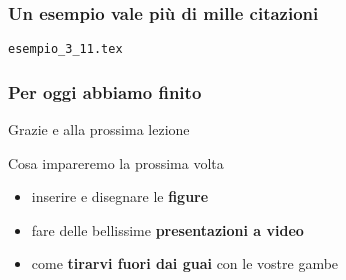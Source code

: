 \documentclass[svgnames,%
	ucs,%
	pdftex]{guitbeamer}
\begin{document}
\begin{frame}
\begin{columns}
		\begin{LaTeXoutput}
			\\
			\\
			\\	
			\\
			\\
			\\
			\\
			\\
			\\
			\\
		\end{LaTeXoutput}
	\end{columns}
\end{frame}
\begin{frame}
  \frametitle{Un esempio vale pi\`u di mille citazioni}
	\begin{center}
		\alert{\texttt{esempio\_3\_11.tex}}
	\end{center}
\end{frame}
\begin{frame}
  \frametitle{Per oggi abbiamo finito}
	\begin{center}
		\huge
		Grazie e alla prossima lezione
	\end{center}
  \medskip
	\begin{block}{Cosa impareremo la prossima volta}
		\begin{itemize}
			\item inserire e disegnare le \textbf{figure}
			\item fare delle bellissime \textbf{presentazioni a video}
			\item come \textbf{tirarvi fuori dai guai} con le vostre gambe
		\end{itemize}
	\end{block}
\end{frame}
\end{document}
